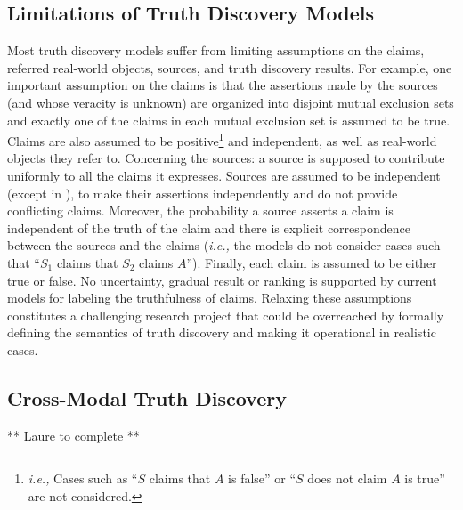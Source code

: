 \documentclass[prodmode,acmtecs]{acmsmall} %
\begin{document}
\subsection{Limitations of Truth Discovery Models} 

Most truth discovery models suffer from limiting assumptions on the claims, referred real-world objects, sources, and truth discovery results. For example, one important assumption on the claims is that the assertions made by the sources (and whose veracity is unknown) are organized into disjoint mutual exclusion sets and exactly one of the claims in each mutual exclusion set is assumed to be true. Claims are also assumed to be positive\footnote{\scriptsize{{\it i.e.,}  Cases such  as ``$S$ claims that $A$ is false'' or ``$S$ does not claim $A$ is true'' are not considered.}} and  independent, as well as real-world objects they refer to. Concerning the sources: a source is supposed to contribute uniformly to all the claims it expresses. Sources are assumed to be independent (except in \cite{DongBHS10a}), to make their assertions independently and do not provide conflicting claims. Moreover, the probability a source asserts a claim is independent of the truth of the claim and there is explicit correspondence 
between the sources and the claims ({\it i.e.,} the models do not consider cases such that ``$S_1$ claims that $S_2$ claims $A$''). Finally, each claim is assumed to be either true or false. No uncertainty, gradual result or ranking is supported by current models for labeling the truthfulness of claims. 
% 
Relaxing these assumptions constitutes a challenging research project that could be overreached by formally defining the semantics of truth discovery and making it operational in realistic cases. %




\subsection{Cross-Modal Truth Discovery} 
** Laure to complete **
\end{document}

